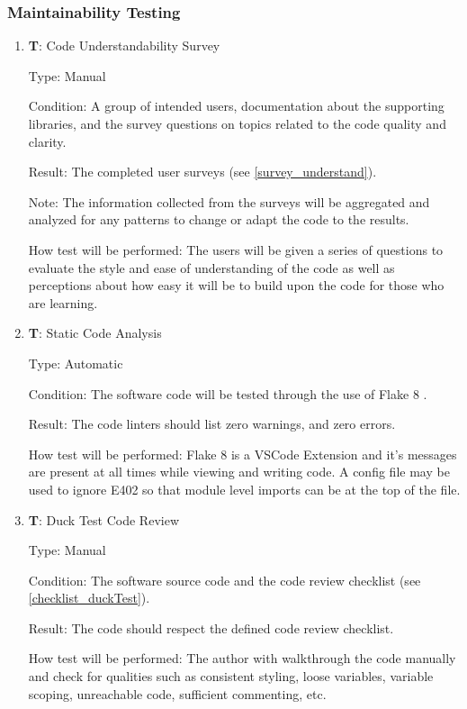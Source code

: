 \documentclass[12pt, titlepage]{article}
\newcounter{testnum} %
\begin{document}
\subsubsection{Maintainability Testing}

\begin{enumerate}

  \item{\textbf{T\thetestnum \label{T_understandSurvey}}: Code Understandability Survey\\}
            
  Type: Manual
            
  Condition: A group of intended users, 
  documentation about the supporting libraries, and the survey questions on topics related 
  to the code quality and clarity.
            
  Result: The completed user surveys (see \ref{survey_understand}).
            
  Note: The information collected from the surveys
  will be aggregated and analyzed for any patterns to
  change or adapt the code to the results.
            
  How test will be performed: The users will be given a series of questions to evaluate 
  the style and ease of understanding of the code as well as perceptions about how easy it will 
  be to build upon the code for those who are learning.

  \item{\textbf{T\thetestnum \label{T_linters}}: Static Code Analysis\\}

  Type: Automatic
            
  Condition: The software code will be tested through the use of Flake 8 \citep{Flake8}.
            
  Result: The code linters should list zero warnings, and zero errors.
            
  How test will be performed: Flake 8 is a VSCode Extension and it's messages are present at all times while 
  viewing and writing code. A config file may be used to ignore E402 so that module level imports can be at the top of the file.

  \item{\textbf{T\thetestnum \label{T_duckTest}}: Duck Test Code Review\\}

  Type: Manual
            
  Condition: The software source code and the code review checklist (see \ref{checklist_duckTest}).
            
  Result: The code should respect the defined code review checklist.
            
  How test will be performed: The author with walkthrough the code manually and check for qualities
    such as consistent styling, loose variables, variable scoping, unreachable code, 
    sufficient commenting, etc.
\end{enumerate}
\end{document}
